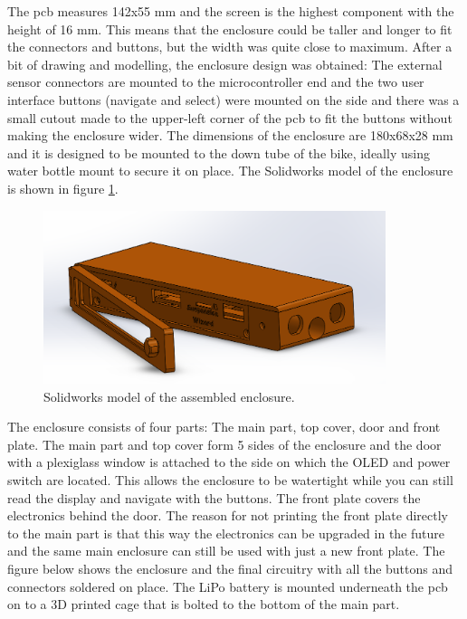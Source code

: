 \documentclass[a4paper,11pt]{article} %
\begin{document}
The pcb measures 142x55 mm and the screen is the highest component with the height of 16 mm. This means that the enclosure could be taller and longer to fit the connectors and buttons, but the width was quite close to maximum. After a bit of drawing and modelling, the enclosure design was obtained: The external sensor connectors are mounted to the microcontroller end and the two user interface buttons (navigate and select) were mounted on the side and there was a small cutout made to the upper-left corner of the pcb to fit the buttons without making the enclosure wider. The dimensions of the enclosure are 180x68x28 mm and it is designed to be mounted to the down tube of the bike, ideally using water bottle mount to secure it on place. The Solidworks model of the enclosure is shown in figure \ref{fig:enclosure_CAD}.

\begin{figure}[H]
    \centering
    \includegraphics[width=100mm]{Figures/enclosure_assembly.png}
    \caption{Solidworks model of the assembled enclosure.}
    \label{fig:enclosure_CAD}
\end{figure}

The enclosure consists of four parts: The main part, top cover, door and front plate. The main part and top cover form 5 sides of the enclosure and the door with a plexiglass window is attached to the side on which the OLED and power switch are located. This allows the enclosure to be watertight while you can still read the display and navigate with the buttons. The front plate covers the electronics behind the door. The reason for not printing the front plate directly to the main part is that this way the electronics can be upgraded in the future and the same main enclosure can still be used with just a new front plate. The figure below shows the enclosure and the final circuitry with all the buttons and connectors soldered on place. The LiPo battery is mounted underneath the pcb on to a 3D printed cage that is bolted to the bottom of the main part.
\end{document}
